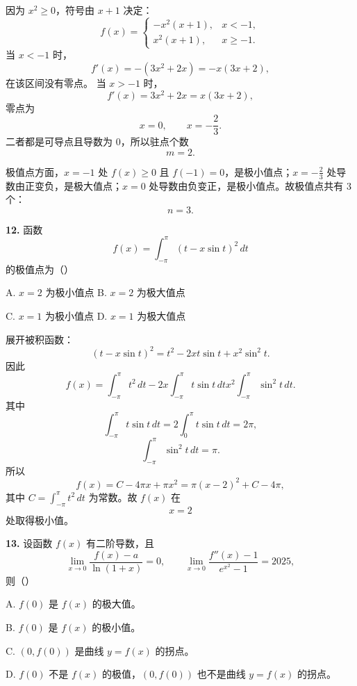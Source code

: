 \begin{solutionblock}
因为 \(x^2\ge0\)，符号由 \(x+1\) 决定：
\[
f(x)=
\begin{cases}
-x^2(x+1),&x<-1,\\
x^2(x+1),&x\ge-1.
\end{cases}
\]
当 \(x<-1\) 时，
\[
f'(x)=-(3x^2+2x)=-x(3x+2),
\]
在该区间没有零点。
当 \(x>-1\) 时，
\[
f'(x)=3x^2+2x=x(3x+2),
\]
零点为
\[
x=0,\qquad x=-\frac23.
\]
二者都是可导点且导数为 0，所以驻点个数
\[
m=2.
\]

极值点方面，\(x=-1\) 处 \(f(x)\ge0\) 且 \(f(-1)=0\)，是极小值点；\(x=-\frac23\) 处导数由正变负，是极大值点；\(x=0\) 处导数由负变正，是极小值点。故极值点共有 3 个：
\[
n=3.
\]

\end{solutionblock}

\begin{problemblock}
\textbf{12.} 函数
\[
f(x)=\int_{-\pi}^{\pi}(t-x\sin t)^2\,dt
\]
的极值点为（\quad）

A. \(x=2\) 为极小值点 \qquad B. \(x=2\) 为极大值点

C. \(x=1\) 为极小值点 \qquad D. \(x=1\) 为极大值点
\end{problemblock}

\begin{solutionblock}
展开被积函数：
\[
(t-x\sin t)^2=t^2-2xt\sin t+x^2\sin^2t.
\]
因此
\[
f(x)=\int_{-\pi}^{\pi}t^2\,dt
-2x\int_{-\pi}^{\pi}t\sin t\,dt
x^2\int_{-\pi}^{\pi}\sin^2t\,dt.
\]
其中
\[
\int_{-\pi}^{\pi}t\sin t\,dt=2\int_0^\pi t\sin t\,dt=2\pi,
\]
\[
\int_{-\pi}^{\pi}\sin^2t\,dt=\pi.
\]
所以
\[
f(x)=C-4\pi x+\pi x^2
=\pi(x-2)^2+C-4\pi,
\]
其中 \(C=\int_{-\pi}^{\pi}t^2\,dt\) 为常数。故 \(f(x)\) 在
\[
x=2
\]
处取得极小值。

\end{solutionblock}

\begin{problemblock}
\textbf{13.} 设函数 \(f(x)\) 有二阶导数，且
\[
\lim_{x\to0}\frac{f(x)-a}{\ln(1+x)}=0,
\qquad
\lim_{x\to0}\frac{f''(x)-1}{e^{x^2}-1}=2025,
\]
则（\quad）

A. \(f(0)\) 是 \(f(x)\) 的极大值。

B. \(f(0)\) 是 \(f(x)\) 的极小值。

C. \((0,f(0))\) 是曲线 \(y=f(x)\) 的拐点。

D. \(f(0)\) 不是 \(f(x)\) 的极值，\((0,f(0))\) 也不是曲线 \(y=f(x)\) 的拐点。
\end{problemblock}

